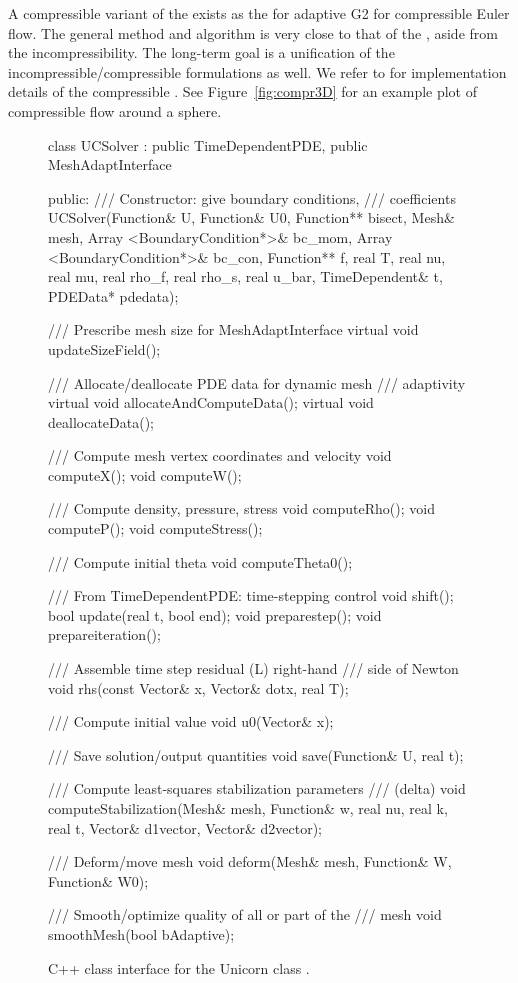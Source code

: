 A compressible variant of the  exists as the
 for adaptive G2 for compressible Euler flow. The
general method and algorithm is very close to that of the
, aside from the incompressibility. The long-term goal
is a unification of the incompressible/compressible formulations as
well. We refer to \citet{Nazarov2009} for implementation details of
the compressible . See Figure~\ref{fig:compr3D} for an
example plot of compressible flow around a sphere.

\begin{figure}
\bwfig
\begin{c++}
class UCSolver :
  public TimeDependentPDE, public MeshAdaptInterface
{
public:
  /// Constructor: give boundary conditions,
  /// coefficients
  UCSolver(Function& U, Function& U0,
           Function** bisect, Mesh& mesh,
           Array <BoundaryCondition*>& bc_mom,
           Array <BoundaryCondition*>& bc_con,
           Function** f, real T, real nu,
           real mu, real rho_f, real rho_s,
           real u_bar, TimeDependent& t,
           PDEData* pdedata);

  /// Prescribe mesh size for MeshAdaptInterface
  virtual void updateSizeField();

  /// Allocate/deallocate PDE data for dynamic mesh
  /// adaptivity
  virtual void allocateAndComputeData();
  virtual void deallocateData();

  /// Compute mesh vertex coordinates and velocity
  void computeX();
  void computeW();

  /// Compute density, pressure, stress
  void computeRho();
  void computeP();
  void computeStress();

  /// Compute initial theta
  void computeTheta0();

  /// From TimeDependentPDE: time-stepping control
  void shift();
  bool update(real t, bool end);
  void preparestep();
  void prepareiteration();

  /// Assemble time step residual (L) right-hand
  /// side of Newton
  void rhs(const Vector& x, Vector& dotx, real T);

  /// Compute initial value
  void u0(Vector& x);

  /// Save solution/output quantities
  void save(Function& U, real t);

  /// Compute least-squares stabilization parameters
  /// (delta)
  void computeStabilization(Mesh& mesh, Function& w,
                            real nu, real k, real t,
                            Vector& d1vector,
                            Vector& d2vector);

  /// Deform/move mesh
  void deform(Mesh& mesh, Function& W, Function& W0);

  /// Smooth/optimize quality of all or part of the
  /// mesh
  void smoothMesh(bool bAdaptive);
}
\end{c++}
\caption{C++ class interface for the Unicorn class .}
\label{code:UCSolver}
\end{figure}

